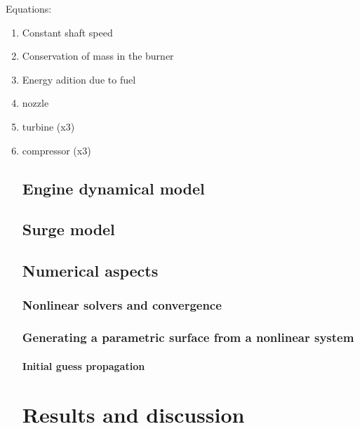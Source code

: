 \documentclass[tcc]{subfiles}
\begin{document}
Equations:
\begin{enumerate}
    \item Constant shaft speed
    \item Conservation of mass in the burner
    \item Energy adition due to fuel
    \item nozzle
    \item turbine (x3)
    \item compressor (x3)

\section{Engine dynamical model}
\section{Surge model}
\section{Numerical aspects}
\subsection{Nonlinear solvers and convergence}
\subsection{Generating a parametric surface from a nonlinear system}
\subsubsection{Initial guess propagation}

\chapter{Results and discussion}

\end{enumerate}
\end{document}
